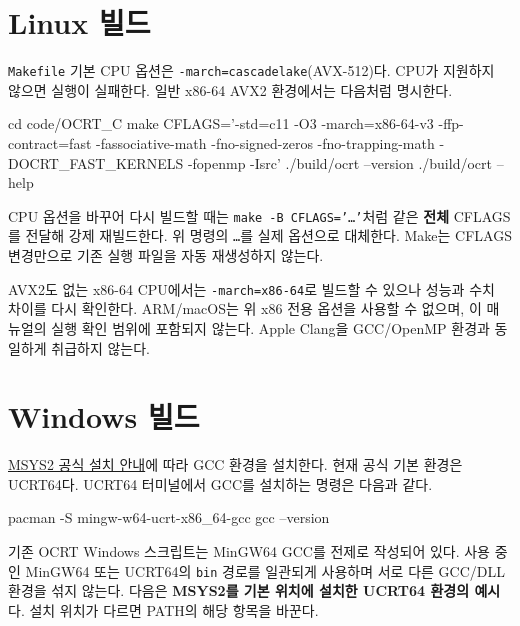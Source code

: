 \section{Linux 빌드}
\label{sec:auto:02_installation:3}
\texttt{Makefile} 기본 CPU 옵션은 \texttt{-\allowbreak{}march=\allowbreak{}cascadelake}(AVX-512)다. CPU가 지원하지 않으면 실행이 실패한다. 일반 x86-64 AVX2 환경에서는 다음처럼 명시한다.


\par\noindent\begin{minipage}{\linewidth}
\begin{ManualCode}
cd code/OCRT_C
make CFLAGS='-std=c11 -O3 -march=x86-64-v3 -ffp-contract=fast -fassociative-math -fno-signed-zeros -fno-trapping-math -DOCRT_FAST_KERNELS -fopenmp -Isrc'
./build/ocrt --version
./build/ocrt --help
\end{ManualCode}
\end{minipage}\par

CPU 옵션을 바꾸어 다시 빌드할 때는 \texttt{make -\allowbreak{}B CFLAGS=\allowbreak{}'\ldots{}'}처럼 같은 \textbf{전체} CFLAGS를 전달해 강제 재빌드한다. 위 명령의 \texttt{\ldots{}}를 실제 옵션으로 대체한다. Make는 CFLAGS 변경만으로 기존 실행 파일을 자동 재생성하지 않는다.

AVX2도 없는 x86-64 CPU에서는 \texttt{-\allowbreak{}march=\allowbreak{}x86-\allowbreak{}64}로 빌드할 수 있으나 성능과 수치 차이를 다시 확인한다. ARM/macOS는 위 x86 전용 옵션을 사용할 수 없으며, 이 매뉴얼의 실행 확인 범위에 포함되지 않는다. Apple Clang을 GCC/OpenMP 환경과 동일하게 취급하지 않는다.

\section{Windows 빌드}
\label{sec:auto:02_installation:4}
\href{https://www.msys2.org/}{MSYS2 공식 설치 안내}에 따라 GCC 환경을 설치한다. 현재 공식 기본 환경은 UCRT64다. UCRT64 터미널에서 GCC를 설치하는 명령은 다음과 같다.


\par\noindent\begin{minipage}{\linewidth}
\begin{ManualCode}
pacman -S mingw-w64-ucrt-x86_64-gcc
gcc --version
\end{ManualCode}
\end{minipage}\par

기존 OCRT Windows 스크립트는 MinGW64 GCC를 전제로 작성되어 있다. 사용 중인 MinGW64 또는 UCRT64의 \texttt{bin} 경로를 일관되게 사용하며 서로 다른 GCC/DLL 환경을 섞지 않는다. 다음은 \textbf{MSYS2를 기본 위치에 설치한 UCRT64 환경의 예시}다. 설치 위치가 다르면 PATH의 해당 항목을 바꾼다.

